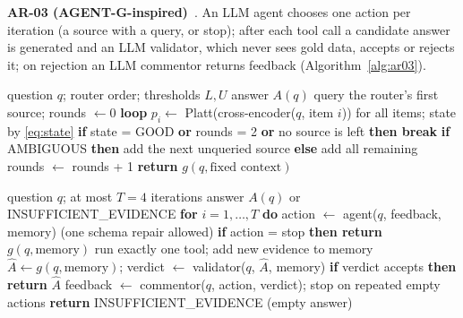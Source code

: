 \documentclass[conference]{IEEEtran}
\begin{document}
\textbf{AR-03 (AGENT-G-inspired)}~\cite{agentg2025}. An LLM agent chooses one action per iteration (a source with a query, or stop); after each tool call a candidate answer is generated and an LLM validator, which never sees gold data, accepts or rejects it; on rejection an LLM commentor returns feedback (Algorithm~\ref{alg:ar03}).

\begin{algorithm}[!t]
\caption{AR-02 calibrated corrective retrieval}
\label{alg:ar02}
\begin{algorithmic}[1]
\Require question $q$; router order; thresholds $L,U$
\Ensure answer $A(q)$
\State query the router's first source; rounds $\leftarrow 0$
\State \textbf{loop}
\State \hspace*{1\algorithmicindent}$p_i\leftarrow$ Platt(cross-encoder($q$, item $i$)) for all items; state by \eqref{eq:state}
\State \hspace*{1\algorithmicindent}\textbf{if} state = GOOD \textbf{or} rounds = 2 \textbf{or} no source is left \textbf{then break}
\State \hspace*{1\algorithmicindent}\textbf{if} AMBIGUOUS \textbf{then} add the next unqueried source \textbf{else} add all remaining
\State \hspace*{1\algorithmicindent}rounds $\leftarrow$ rounds + 1
\State \textbf{return} $g(q,{\text{fixed context}})$
\end{algorithmic}
\end{algorithm}

\begin{algorithm}[!t]
\caption{AR-03 agent--validator--commentor loop}
\label{alg:ar03}
\begin{algorithmic}[1]
\Require question $q$; at most $T=4$ iterations
\Ensure answer $A(q)$ or INSUFFICIENT\_EVIDENCE
\State \textbf{for} $i=1,\ldots ,T$ \textbf{do}
\State \hspace*{1\algorithmicindent}action $\leftarrow$ agent($q$, feedback, memory) (one schema repair allowed)
\State \hspace*{1\algorithmicindent}\textbf{if} action = stop \textbf{then return} $g(q,{\text{memory}})$
\State \hspace*{1\algorithmicindent}run exactly one tool; add new evidence to memory
\State \hspace*{1\algorithmicindent}$\hat{A}\leftarrow g(q,{\text{memory}})$; verdict $\leftarrow$ validator($q$, $\hat{A}$, memory)
\State \hspace*{1\algorithmicindent}\textbf{if} verdict accepts \textbf{then return} $\hat{A}$
\State \hspace*{1\algorithmicindent}feedback $\leftarrow$ commentor($q$, action, verdict); stop on repeated empty actions
\State \textbf{return} INSUFFICIENT\_EVIDENCE (empty answer)
\end{algorithmic}
\end{algorithm}
\end{document}
